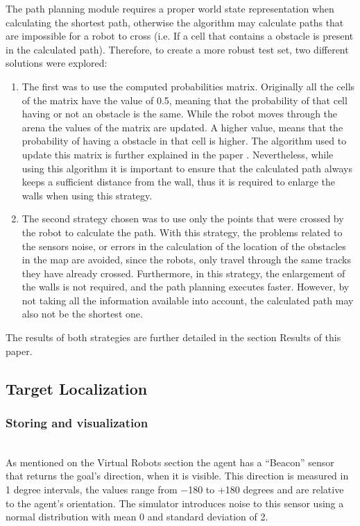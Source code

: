 \documentclass[oribibl]{llncs}
\begin{document}
The path planning module requires a proper world state representation when calculating the shortest path, otherwise the algorithm may calculate paths that are impossible for a robot to cross (i.e. If a cell that contains a obstacle is present in the calculated path). Therefore, to create a more robust test set, two different solutions were explored:
\begin{enumerate}
\item The first was to use the computed probabilities matrix. Originally all the cells of the matrix have the value of 0.5, meaning that the probability of that cell having or not an obstacle is the same. While the robot moves through the arena the values of the matrix are updated. A higher value, means that the probability of having a obstacle in that cell is higher. The algorithm used to update this matrix is further explained in the paper \cite{baboehelder}. Nevertheless, while using this algorithm it is important to ensure that the calculated path always keeps a sufficient distance from the wall, thus it is required to enlarge the walls when using this strategy.

\item The second strategy chosen was to use only the points that were crossed by the robot to calculate the path. With this strategy, the problems related to the sensors noise, or errors in the calculation of the location of the obstacles in the map are avoided, since the robots, only travel through the same tracks they have already crossed. Furthermore, in this strategy, the enlargement of the walls is not required, and the path planning executes faster. However, by not taking all the information available into account, the calculated path may also not be the shortest one.
\end{enumerate}

The results of both strategies are further detailed in the section Results of this paper.

\subsection{Target Localization}
\label{sec:target-loc}
\subsubsection{Storing and visualization}\hfill \\

As mentioned on the Virtual Robots section the agent has a ``Beacon''
sensor that returns the goal's direction, when it is visible. This direction
is measured in 1 degree intervals, the values range from $-$180 to +180 degrees and
are relative to the agent's orientation. The simulator introduces noise to this sensor
using a normal distribution with mean 0 and standard deviation of 2.
\end{document}
